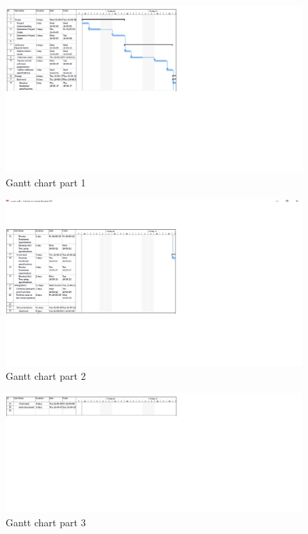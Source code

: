 \documentclass[10pt,onecolumn]{MainDocument}
\begin{document}
\begin{center}
\begin{figure}[h]
\centering
\includegraphics[trim = {0 10cm 14cm 0},clip, scale=0.58]{gantt1}
\caption{Gantt chart part 1}
\end{figure}
\end{center}


\begin{center}
\begin{figure}[h]
\centering
\includegraphics[trim = {0 6cm 14cm 2cm},clip, scale=0.58]{gantt2}
\caption{Gantt chart part 2}
\end{figure}
\end{center}


\begin{center}
\begin{figure}[h]
\centering
\includegraphics[trim = {0 11cm 14cm 0},clip, scale=0.58]{gantt3}
\caption{Gantt chart part 3}
\end{figure}
\end{center}
\end{document}
